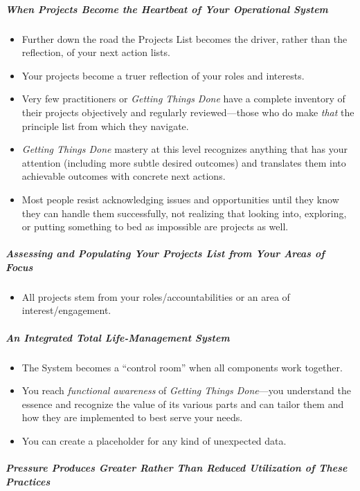 \documentclass{article}
\begin{document}
\subparagraph{When Projects Become the Heartbeat of Your Operational System}

\begin{itemize}
 \item Further down the road the Projects List becomes the driver, rather than the reflection, of your next action lists.
 \item Your projects become a truer reflection of your roles and interests.
 \item Very few practitioners or \textit{Getting Things Done} have a complete inventory of their projects objectively and regularly reviewed---those who do make \emph{that} the principle list from which they navigate.
 \item \textit{Getting Things Done} mastery at this level recognizes anything that has your attention (including more subtle desired outcomes) and translates them into achievable outcomes with concrete next actions.
 \item Most people resist acknowledging issues and opportunities until they know they can handle them successfully, not realizing that looking into, exploring, or putting something to bed as impossible are projects as well.
\end{itemize}

\subparagraph{Assessing and Populating Your Projects List from Your Areas of Focus}

\begin{itemize}
 \item All projects stem from your roles/accountabilities or an area of interest/engagement.
\end{itemize}

\subparagraph{An Integrated Total Life-Management System}

\begin{itemize}
 \item The System becomes a ``control room'' when all components work together.
 \item You reach \emph{functional awareness} of \textit{Getting Things Done}---you understand the essence and recognize the value of its various parts and can tailor them and how they are implemented to best serve your needs.
 \item You can create a placeholder for any kind of unexpected data.
\end{itemize}

\subparagraph{Pressure Produces Greater Rather Than Reduced Utilization of These Practices}
\end{document}

